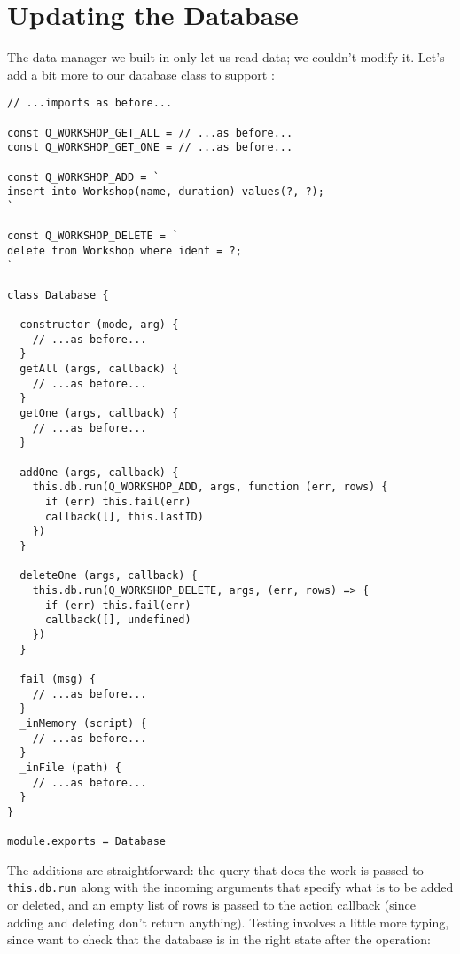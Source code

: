 \section{Updating the Database}\label{s:db-mutate}

The data manager we built in  only let us read data;
we couldn't modify it.
Let's add a bit more to our database class to support :

\begin{verbatim}
// ...imports as before...

const Q_WORKSHOP_GET_ALL = // ...as before...
const Q_WORKSHOP_GET_ONE = // ...as before...

const Q_WORKSHOP_ADD = `
insert into Workshop(name, duration) values(?, ?);
`

const Q_WORKSHOP_DELETE = `
delete from Workshop where ident = ?;
`

class Database {

  constructor (mode, arg) {
    // ...as before...
  }
  getAll (args, callback) {
    // ...as before...
  }
  getOne (args, callback) {
    // ...as before...
  }

  addOne (args, callback) {
    this.db.run(Q_WORKSHOP_ADD, args, function (err, rows) {
      if (err) this.fail(err)
      callback([], this.lastID)
    })
  }

  deleteOne (args, callback) {
    this.db.run(Q_WORKSHOP_DELETE, args, (err, rows) => {
      if (err) this.fail(err)
      callback([], undefined)
    })
  }

  fail (msg) {
    // ...as before...
  }
  _inMemory (script) {
    // ...as before...
  }
  _inFile (path) {
    // ...as before...
  }
}

module.exports = Database
\end{verbatim}

The additions are straightforward:
the query that does the work is passed to \texttt{this.db.run} along with the incoming arguments
that specify what is to be added or deleted,
and an empty list of rows is passed to the action callback
(since adding and deleting don't return anything).
Testing involves a little more typing,
since want to check that the database is in the right state after the operation:

